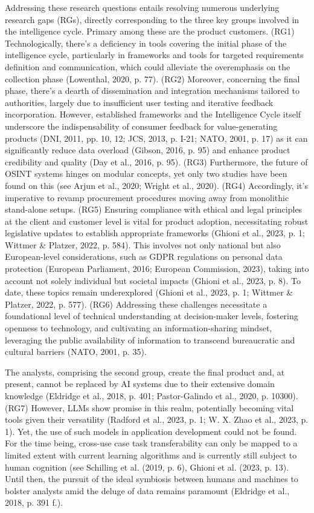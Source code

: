 \documentclass[10pt]{article}
\begin{document}
Addressing these research questions entails resolving numerous underlying research gaps (RGs),
directly corresponding to the three key groups involved in the intelligence cycle. Primary among
these are the product customers. (RG1) Technologically, there's a deficiency in tools covering the
initial phase of the intelligence cycle, particularly in frameworks and tools for targeted requirements
definition and communication, which could alleviate the overemphasis on the collection phase (Lowenthal, 2020, p. 77).
(RG2) Moreover, concerning the final phase, there's a dearth of dissemination and integration mechanisms
tailored to authorities, largely due to insufficient user testing and iterative feedback incorporation.
However, established frameworks and the Intelligence Cycle itself underscore the indispensability of
consumer feedback for value-generating products (DNI, 2011, pp. 10, 12; JCS, 2013, p. I-21; NATO, 2001, p. 17) as
it can significantly reduce data overload (Gibson, 2016, p. 95) and enhance product credibility and quality (Day et al., 2016, p. 95).
(RG3) Furthermore, the future of OSINT systems hinges on modular concepts, yet only two studies have
been found on this (see Arjun et al., 2020; Wright et al., 2020). (RG4) Accordingly, it's imperative to revamp
procurement procedures moving away from monolithic stand-alone setups. (RG5) Ensuring compliance with
ethical and legal principles at the client and customer level is vital for product adoption,
necessitating robust legislative updates to establish appropriate frameworks
(Ghioni et al., 2023, p. 1; Wittmer & Platzer, 2022, p. 584). This involves not only national but
also European-level considerations, such as GDPR regulations on personal data protection
(European Parliament, 2016; European Commission, 2023), taking into account not solely
individual but societal impacts (Ghioni et al., 2023, p. 8). To date, these topics remain
underexplored (Ghioni et al., 2023, p. 1; Wittmer & Platzer, 2022, p. 577). (RG6) Addressing these
challenges necessitate a foundational level of technical understanding at decision-maker
levels, fostering openness to technology, and cultivating an information-sharing mindset,
leveraging the public availability of information to transcend bureaucratic and cultural
barriers (NATO, 2001, p. 35).

The analysts, comprising the second group, create the final
product and, at present, cannot be replaced by AI systems due to their extensive domain
knowledge (Eldridge et al., 2018, p. 401; Pastor-Galindo et al., 2020, p. 10300). (RG7) However,
LLMs show promise in this realm, potentially becoming vital tools given their versatility
(Radford et al., 2023, p. 1; W. X. Zhao et al., 2023, p. 1). Yet, the use of such models in
application development could not be found. For the time being, cross-use case task
transferability can only be mapped to a limited extent with current learning algorithms
and is currently still subject to human cognition (see Schilling et al. (2019, p. 6), Ghioni et al. (2023, p. 13).
Until then, the pursuit of the ideal symbiosis between humans and machines to bolster analysts
amid the deluge of data remains paramount (Eldridge et al., 2018, p. 391 f.).
\end{document}
